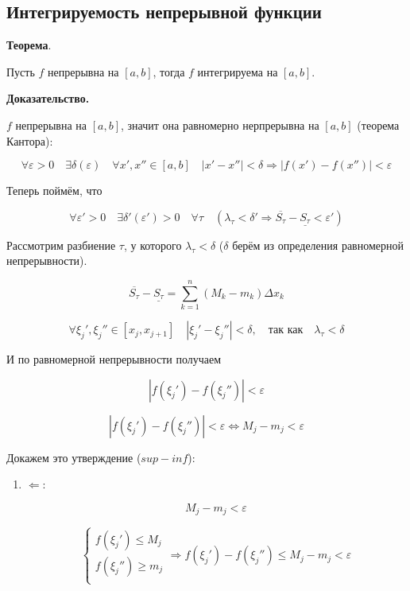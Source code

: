 \documentclass[a4paper]{article}
\begin{document}
\begin{definit}
\hypertarget{p7}{}
\subsection*{Интегрируемость непрерывной функции}

\begin{htheorem}\textbf{Теорема}.

Пусть $f$ непрерывна на $[a,b]$, тогда $f$ интегрируема на $[a,b]$.
\end{htheorem}


\begin{hproof}\textbf{Доказательство.}

$f$ непрерывна на $[a,b]$, значит она равномерно нерпрерывна на $[a,b]$ (теорема Кантора):

\[
\forall \varepsilon > 0 \quad \exists \delta ( \varepsilon ) \quad \forall x', x'' \in [a,b] \quad |x'-x''| < \delta \Rightarrow |f(x') - f(x'')| < \varepsilon
\]

Теперь поймём, что 

\[
\forall \varepsilon' > 0 \quad \exists \delta'(\varepsilon') > 0 \quad \forall \tau \quad (\lambda_\tau < \delta' \Rightarrow \overline{S_\tau} - \underline{S_\tau} < \varepsilon')
\]

Рассмотрим разбиение $\tau$, у которого $\lambda_\tau < \delta$ ($\delta$ берём из определения равномерной непрерывности).

\[
\overline{S_\tau} - \underline{S_\tau} = \sum_{k=1}^n (M_k-m_k) \Delta x_k
\]

\[
\forall \xi_j', \xi_j'' \in [x_j, x_{j+1}] \quad |\xi_j' - \xi_j''| < \delta, \quad \text{так как} \quad \lambda_\tau < \delta
\]

И по равномерной непрерывности получаем

\[
|f(\xi_j') - f(\xi_j'')| < \varepsilon
\]

\hypertarget{supinf}{}
\[
|f(\xi_j') - f(\xi_j'')| < \varepsilon \Leftrightarrow M_j - m_j < \varepsilon
\]

Докажем это утверждение ($sup - inf$):
\begin{enumerate}
\item $\Leftarrow$:

\[
M_j - m_j < \varepsilon
\]

\[
\begin{cases}
f(\xi_j') \leq M_j \\
f(\xi_j'') \geq m_j \\
\end{cases}
\Rightarrow f(\xi_j') - f(\xi_j'') \leq M_j-m_j < \varepsilon
\]


\end{enumerate}
\end{hproof}
\end{definit}
\end{document}
